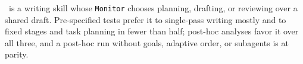 \condAgenticCogWriter\ is a writing skill whose \texttt{Monitor} chooses planning, drafting, or reviewing over a shared draft.
Pre-specified tests prefer it to single-pass writing mostly and to fixed stages and task planning in fewer than half; post-hoc analyses favor it over all three, and a post-hoc run without goals, adaptive order, or subagents is at parity.
